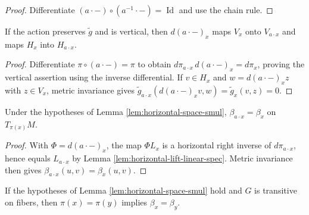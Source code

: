 \begin{proof}
\leanok
\sketch Differentiate $(a\cdot {-})\circ(a^{-1}\cdot {-})=\operatorname{Id}$ and use the chain rule.
\end{proof}

\begin{lemma}
\label{lem:horizontal-space-smul}
\leanok
{}
If the action preserves $\tilde g$ and is vertical, then $d(a\cdot {-})_x$ maps $V_x$ onto $V_{a\cdot x}$ and maps $H_x$ into $H_{a\cdot x}$.
\end{lemma}

\begin{proof}
\leanok
{}
\sketch Differentiate $\pi\circ(a\cdot {-})=\pi$ to obtain $d\pi_{a\cdot x}\,d(a\cdot {-})_x=d\pi_x$, proving the vertical assertion using the inverse differential. If $v\in H_x$ and $w=d(a\cdot {-})_xz$ with $z\in V_x$, metric invariance gives $\tilde g_{a\cdot x}(d(a\cdot {-})_xv,w)=\tilde g_x(v,z)=0$.
\end{proof}

\begin{lemma}
\label{lem:submersion-inner-smul}
\leanok
{}
Under the hypotheses of Lemma \ref{lem:horizontal-space-smul}, $\beta_{a\cdot x}=\beta_x$ on $T_{\pi(x)}M$.
\end{lemma}

\begin{proof}
\leanok
{}
\sketch With $\Phi=d(a\cdot {-})_x$, the map $\Phi L_x$ is a horizontal right inverse of $d\pi_{a\cdot x}$, hence equals $L_{a\cdot x}$ by Lemma \ref{lem:horizontal-lift-linear-spec}. Metric invariance then gives $\beta_{a\cdot x}(u,v)=\beta_x(u,v)$.
\end{proof}

\begin{lemma}
\label{lem:submersion-inner-congr}
\leanok
{}
If the hypotheses of Lemma \ref{lem:horizontal-space-smul} hold and $G$ is transitive on fibers, then $\pi(x)=\pi(y)$ implies $\beta_x=\beta_y$.
\end{lemma}

